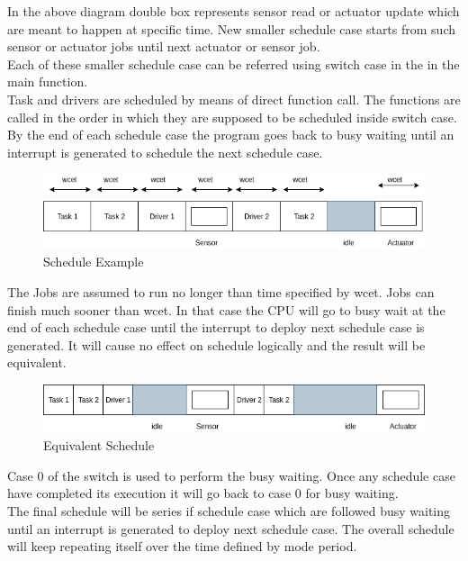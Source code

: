 \documentclass[16pt]{report}
\begin{document}
In the above diagram double box represents sensor read or actuator update which are meant to happen at specific time. New smaller schedule case starts from such sensor or actuator jobs until next actuator or sensor job.\\
Each of these smaller schedule case can be referred using switch case in the in the main function.\\
Task and drivers are scheduled by means of direct function call. The functions are called in the order in which they are supposed to be scheduled inside switch case. By the end of each schedule case the program goes back to busy waiting until an interrupt is generated to schedule the next schedule case.

\begin{figure}[H]
\centering
\includegraphics[width=1\linewidth]{12scheduling.png}
\caption{Schedule Example}
\end{figure}

The Jobs are assumed to run no longer than time specified by wcet. Jobs can finish much sooner than wcet. In that case the CPU will go to busy wait at the end of each schedule case until the interrupt to deploy next schedule case is generated. It will cause no effect on schedule logically and the result will be equivalent.

\begin{figure}[H]
\centering
\includegraphics[width=1\linewidth]{12scheduling2.png}
\caption{Equivalent Schedule}
\end{figure}

Case 0 of the switch is used to perform the busy waiting. Once any schedule case have completed its execution it will go back to case 0 for busy waiting.\\
The final schedule will be series if schedule case which are followed busy waiting until an interrupt is generated to deploy next schedule case. The overall schedule will keep repeating itself over the time defined by mode period. 
\end{document}
